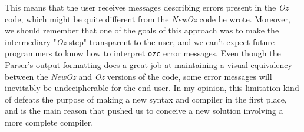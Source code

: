This means that the user receives messages describing errors present in the \textit{Oz} code, which might be quite different from the \textit{NewOz} code he wrote.
Moreover, we should remember that one of the goals of this approach was to make the intermediary "\textit{Oz} step" transparent to the user, and we can't expect future programmers to know how to interpret \texttt{ozc} error messages.
Even though the Parser's output formatting does a great job at maintaining a visual equivalency between the \textit{NewOz} and \textit{Oz} versions of the code, some error messages will inevitably be undecipherable for the end user.
In my opinion, this limitation kind of defeats the purpose of making a new syntax and compiler in the first place, and is the main reason that pushed us to conceive a new solution involving a more complete compiler.

